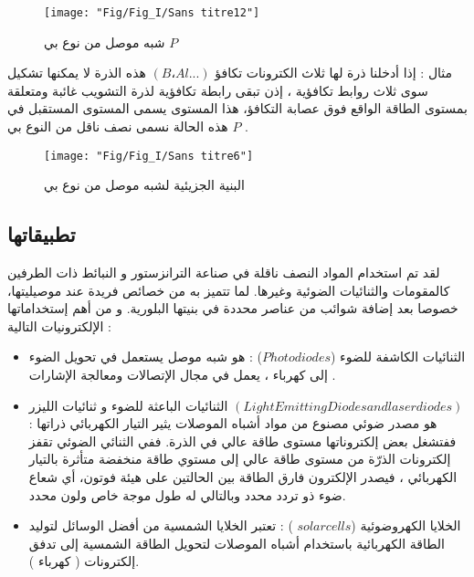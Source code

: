\begin{enumerate}
		\begin{figure}[h!]
			\centering
			\texttt{[image: "Fig/Fig\_I/Sans titre12"]}
			\caption{ 	شبه موصل من نوع بي $ P $  }
			\label{fig:sans-titre12}
		\end{figure}
		\FloatBarrier

		مثال : إذا أدخلنا ذرة لها ثلاث الكترونات تكافؤ $ (B،Al ...) $ هذه الذرة لا يمكنها تشكيل سوى ثلاث روابط تكافؤية ، إذن تبقى رابطة تكافؤية لذرة التشويب غائبة ومتعلقة بمستوى الطاقة الواقع فوق عصابة التكافؤ، هذا المستوى يسمى المستوى المستقبل في هذه الحالة نسمى نصف ناقل من النوع بي $ P $ .
		\begin{figure*}[h!]
			\centering
			\texttt{[image: "Fig/Fig\_I/Sans titre6"]}
			\caption{البنية الجزيئية لشبه موصل من نوع بي}
			\label{fig:sans-titre6}
		\end{figure*}
		\FloatBarrier
	
\end{enumerate}

\subsection{ تطبيقاتها}

لقد تم استخدام المواد النصف ناقلة في صناعة الترانزستور و النبائط ذات الطرفين كالمقومات والثنائيات الضوئية وغيرها. لما تتميز به من خصائص فريدة عند موصيليتها، خصوصا بعد إضافة شوائب من عناصر محددة في بنيتها البلورية. 
و من أهم إستخداماتها الإلكترونيات التالية :
\begin{itemize}
	\item 
	الثنائيات الكاشفة للضوء ($  ‫‪Photodiodes‬‬  $) : هو شبه موصل يستعمل في تحويل الضوء إلى كهرباء ، يعمل في مجال الإتصالات ومعالجة الإشارات . \cite{a15}
	\item
	الثنائيات الباعثة للضوء و ثنائيات الليزر ‫‪$ (Light‬‬ ‫‪Emitting‬‬ ‫‪Diodes‬‬ and‬ ‫‪laser‬‬ ‫‪diodes‬‬ ) $ : هو مصدر ضوئي مصنوع من مواد أشباه الموصلات يثير التيار الكهربائي ذراتها ففتشغل بعض إلكتروناتها مستوى طاقة عالي في الذرة. ففي الثنائي الضوئي تقفز إلكترونات الذرّة من مستوى طاقة عالي إلى مستوي طاقة منخفضة متأثرة بالتيار الكهربائي ، فيصدر الإلكترون فارق الطاقة بين الحالتين على هيئة فوتون، أي شعاع ضوء ذو تردد محدد وبالتالي له طول موجة خاص ولون محدد. \cite{a16}
	\item
	الخلايا الكهروضوئية ($  solar cells  $ ) : تعتبر الخلايا الشمسية من أفضل الوسائل لتوليد الطاقة الكهربائية باستخدام أشباه الموصلات لتحويل الطاقة الشمسية إلى تدفق إلكترونات ( كهرباء ). \cite{a17}
\end{itemize}

